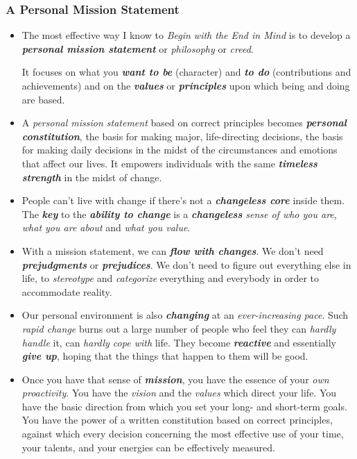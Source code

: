 \documentclass[11pt]{article}
\begin{document}
\subsubsection{A Personal Mission Statement}
\begin{itemize}
\item The most effective way I know to \emph{Begin with the End in Mind} is to develop a \emph{\textbf{personal mission statement}} or \emph{philosophy} or \emph{creed}. 

It focuses on what you \emph{\textbf{want to be}} (character) and \emph{\textbf{to do}} (contributions and achievements) and on the \emph{\textbf{values}} or \emph{\textbf{principles}} upon which being and doing are based.

\item A \emph{personal mission statement} based on correct principles becomes \emph{\textbf{personal constitution}}, the basis for making major, life-directing decisions, the basis for making daily decisions in the midst of the circumstances and emotions that affect our lives. It empowers individuals with the same \emph{\textbf{timeless strength}} in the midst of change.

\item People can't live with change if there's not a \emph{\textbf{changeless core}} inside them. The \emph{\textbf{key}} to the \emph{\textbf{ability to change}} is a \emph{\textbf{changeless} sense of who you are}, \emph{what you are about} and \emph{what you value}.

\item With a mission statement, we can \emph{\textbf{flow with changes}}. We don't need \emph{\textbf{prejudgments}} or \emph{\textbf{prejudices}}. We don't need to figure out everything else in life, to \emph{stereotype} and \emph{categorize} everything and everybody in order to accommodate reality.

\item Our personal environment is also \emph{\textbf{changing}} at an \emph{ever-increasing pace}. Such \emph{rapid change} burns out a large number of people who feel they can \emph{hardly handle} it, can \emph{hardly cope with} life. They become \emph{\textbf{reactive}} and essentially \emph{\textbf{give up}}, hoping that the things that happen to them will be good.

\item Once you have that sense of \emph{\textbf{mission}}, you have the essence of your \emph{own proactivity}. You have the \emph{vision} and the \emph{values} which direct your life. You have the basic direction from which you set your long- and short-term goals. You have the power of a written constitution based on correct principles, against which every decision concerning the most effective use of your time, your talents, and your energies can be effectively measured.
\end{itemize}
\end{document}
